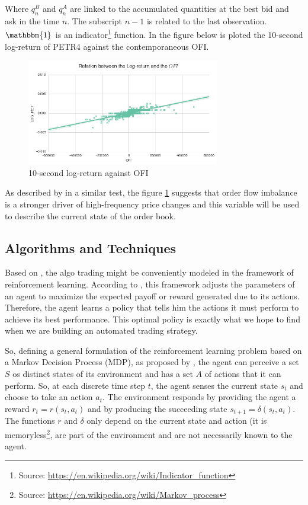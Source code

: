 \documentclass[a4paper]{article}
\begin{document}
Where $q^{B}_{n}$ and $q^{A}_{n}$ are linked to the accumulated quantities at the best bid and ask in the time $n$. The subscript $n-1$ is related to the last observation. $\mathbbm{1}$ is an indicator\footnote{Source: \url{https://en.wikipedia.org/wiki/Indicator_function}} function. In the figure below is ploted the 10-second log-return of PETR4 against the contemporaneous OFI.

\begin{figure}[ht!]
\centering
\includegraphics[width=0.75\textwidth]{figures/ofi_logret.png}
\caption{\label{fig:ofi_linear}10-second log-return against OFI}
\end{figure}

As described by \cite{cont2014price} in a similar test, the figure \ref{fig:ofi_linear} suggests that order flow imbalance is a stronger driver of high-frequency price changes and this variable will be used to describe the current state of the order book.

\subsection{Algorithms and Techniques}
Based on \cite{cont2014price}, the algo trading might be conveniently modeled in the framework of reinforcement learning. According to \cite{du1algorithm}, this framework adjusts the parameters of an agent to maximize the expected payoff or reward generated due to its actions. Therefore, the agent learns a policy that tells him the actions it must perform to achieve its best performance. This optimal policy is exactly what we hope to find when we are building an automated trading strategy.

So, defining a general formulation of the reinforcement learning problem based on a Markov Decision Process (MDP), as proposed by \cite{Mitchell}, the agent can perceive a set $S$ os distinct states of its environment and has a set $A$ of actions that it can perform. So, at each discrete time step $t$, the agent senses the current state $s_t$ and choose to take an action $a_t$. The environment responds by providing the agent a reward $r_t=r(s_t, a_t)$ and by producing the succeeding state $s_{t+1}=\delta(s_t, a_t)$. The functions $r$ and $\delta$ only depend on the current state and action (it is memoryless\footnote{Source: \url{https://en.wikipedia.org/wiki/Markov_process}}, are part of the environment and are not necessarily known to the agent.
\end{document}
